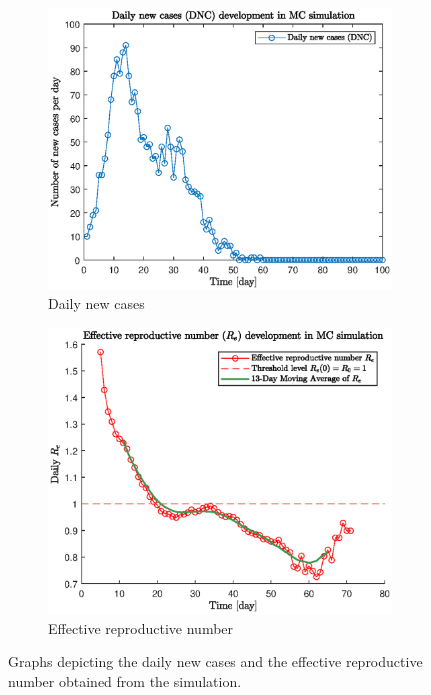 \documentclass[a4paper]{article}
\begin{document}
\begin{figure}[h!]
	\centering
	\begin{subfigure}{.5\textwidth}
		\centering
		\includegraphics[width=\textwidth]{images/dnc.eps}
		\caption{Daily new cases}
		\label{figure:results-dnc}
	\end{subfigure}%
	\begin{subfigure}{.5\textwidth}
		\centering
		\includegraphics[width=\textwidth]{images/r_e.eps}
		\caption{Effective reproductive number}
		\label{figure:results-r-e}
	\end{subfigure}
	\caption{Graphs depicting the daily new cases and the effective reproductive number obtained from the simulation.}
	\label{figure:results-protocol}
\end{figure}
\end{document}
